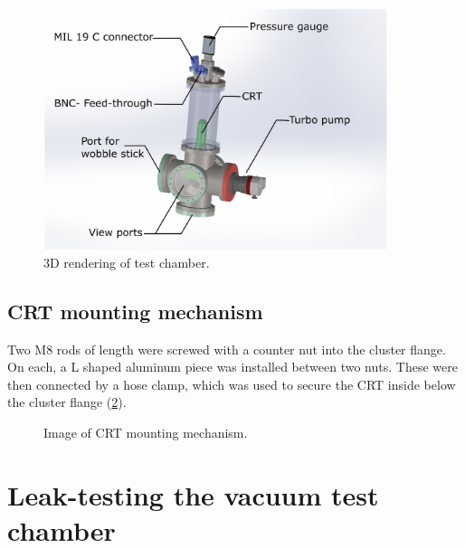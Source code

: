 \begin{figure}[ht]
	\centering
 	
	\includegraphics[width=0.9\textwidth]{./Chapters/vacuum-chamber/vacuum-chamber-annotated} %
	
	\caption{3D rendering of test chamber.}
	\label{fig:3D rendering of test chamber}
\end{figure}
 
\subsection{CRT mounting mechanism}
\label{subsec:CRT mounting mechanism}

Two M8 rods of length  were screwed with a counter nut into the cluster flange. On each, a L shaped aluminum piece was installed between two nuts. These were then connected by a hose clamp, which was used to secure the CRT inside below the cluster flange (\cref{fig:Image of CRT mounting mechanism}).
 

\begin{figure}[h]
	\centering
	
	
	\caption{Image of CRT mounting mechanism.}
	\label{fig:Image of CRT mounting mechanism}
\end{figure}


\section{Leak-testing the vacuum test chamber}
\label{sec:Leak-testing the vacuum test chamber}

